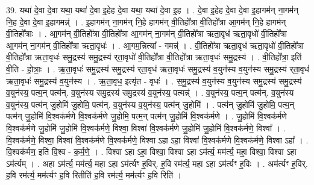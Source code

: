 \documentclass[17pt]{extarticle}
\begin{document}
39. यथा॑ दे॒वा दे॒वा यथा॒ यथा॑ दे॒वा इ॒हेह दे॒वा यथा॒ यथा॑ दे॒वा इ॒ह । . दे॒वा इ॒हेह दे॒वा दे॒वा इ॒हागम॑न् ना॒गम॑न् नि॒ह दे॒वा दे॒वा इ॒हागमन्न्॑ । . इ॒हागम॑न् ना॒गम॑न् नि॒हे हागम॑न् वी॒तिहो᳚त्रा वी॒तिहो᳚त्रा आ॒गम॑न् नि॒हे हागम॑न् वी॒तिहो᳚त्राः । . आ॒गम॑न् वी॒तिहो᳚त्रा वी॒तिहो᳚त्रा आ॒गम॑न् ना॒गम॑न् वी॒तिहो᳚त्रा ऋता॒वृध॑ ऋता॒वृधो॑ वी॒तिहो᳚त्रा आ॒गम॑न् ना॒गम॑न् वी॒तिहो᳚त्रा ऋता॒वृधः॑ । . आ॒गम॒न्नित्या᳚ - गमन्न्॑ । . वी॒तिहो᳚त्रा ऋता॒वृध॑ ऋता॒वृधो॑ वी॒तिहो᳚त्रा वी॒तिहो᳚त्रा ऋता॒वृधः॑ समु॒द्रस्य॑ समु॒द्रस्य॑ र्‌ता॒वृधो॑ वी॒तिहो᳚त्रा वी॒तिहो᳚त्रा ऋता॒वृधः॑ समु॒द्रस्य॑ । . वी॒तिहो᳚त्रा॒ इति॑ वी॒ति - हो॒त्राः॒ । . ऋ॒ता॒वृधः॑ समु॒द्रस्य॑ समु॒द्रस्य॑ र्‌ता॒वृध॑ ऋता॒वृधः॑ समु॒द्रस्य॑ व॒युन॑स्य व॒युन॑स्य समु॒द्रस्य॑ र्‌ता॒वृध॑ ऋता॒वृधः॑ समु॒द्रस्य॑ व॒युन॑स्य । . ऋ॒ता॒वृध॒ इत्यृ॑त - वृधः॑ । . स॒मु॒द्रस्य॑ व॒युन॑स्य व॒युन॑स्य समु॒द्रस्य॑ समु॒द्रस्य॑ व॒युन॑स्य॒ पत्म॒न् पत्म॑न्. व॒युन॑स्य समु॒द्रस्य॑ समु॒द्रस्य॑ व॒युन॑स्य॒ पत्मन्न्॑ । . व॒युन॑स्य॒ पत्म॒न् पत्म॑न्. व॒युन॑स्य व॒युन॑स्य॒ पत्म॑न् जु॒होमि॑ जु॒होमि॒ पत्म॑न्. व॒युन॑स्य व॒युन॑स्य॒ पत्म॑न् जु॒होमि॑ । . पत्म॑न् जु॒होमि॑ जु॒होमि॒ पत्म॒न् पत्म॑न् जु॒होमि॑ वि॒श्वक॑र्मणे वि॒श्वक॑र्मणे जु॒होमि॒ पत्म॒न् पत्म॑न् जु॒होमि॑ वि॒श्वक॑र्मणे । . जु॒होमि॑ वि॒श्वक॑र्मणे वि॒श्वक॑र्मणे जु॒होमि॑ जु॒होमि॑ वि॒श्वक॑र्मणे॒ विश्वा॒ विश्वा॑ वि॒श्वक॑र्मणे जु॒होमि॑ जु॒होमि॑ वि॒श्वक॑र्मणे॒ विश्वा᳚ । . वि॒श्वक॑र्मणे॒ विश्वा॒ विश्वा॑ वि॒श्वक॑र्मणे वि॒श्वक॑र्मणे॒ विश्वा ऽहा ऽहा॒ विश्वा॑ वि॒श्वक॑र्मणे वि॒श्वक॑र्मणे॒ विश्वा ऽहा᳚ । . वि॒श्वक॑र्मण॒ इति॑ वि॒श्व - क॒र्म॒णे॒ । . विश्वा ऽहा ऽहा॒ विश्वा॒ विश्वा ऽहा ऽम॑र्त्य॒ मम॑र्त्य॒ महा॒ विश्वा॒ विश्वा ऽहा ऽम॑र्त्यम् । . अहा ऽम॑र्त्य॒ मम॑र्त्य॒ महा ऽहा ऽम॑र्त्यꣳ ह॒विर्. ह॒वि रम॑र्त्य॒ महा ऽहा ऽम॑र्त्यꣳ ह॒विः । . अम॑र्त्यꣳ ह॒विर्. ह॒वि रम॑र्त्य॒ मम॑र्त्यꣳ ह॒वि रितीति॑ ह॒वि रम॑र्त्य॒ मम॑र्त्यꣳ ह॒वि रिति॑ । \newline
\end{document}
